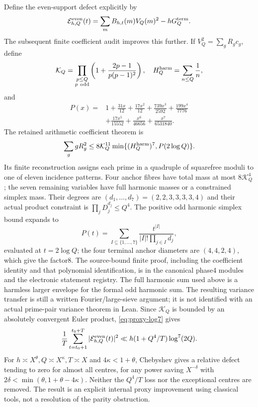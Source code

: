 \documentclass[11pt,a4paper]{article}
\theoremstyle{definition}
\theoremstyle{remark}
\begin{document}
Define the even-support defect explicitly by
\[\mathcal E^{\rm even}_{h,Q}(t)
 =\sum_m B_{h,t}(m)V_Q(m)^2-hG_Q^{\rm term}.\]
The subsequent finite coefficient audit improves this further. If $V_Q^2=\sum_gR_gc_g$, define
\[\mathcal K_Q=\prod_{\substack{p\le Q\\p\ {\rm odd}}}
 \left(1+\frac{2p-1}{p(p-1)^2}\right),\quad H_Q^{\rm harm}=\sum_{n\le Q}\frac1n,\]
and
\begin{align*}
 P(x)={}&1+\frac{31x}{12}+\frac{17x^2}{12}+\frac{739x^3}{2592}
 +\frac{199x^4}{7776}\\
 &+\frac{17x^5}{15552}+\frac{x^6}{46656}+\frac{x^7}{6531840}.
\end{align*}
The retained arithmetic coefficient theorem is
\begin{equation}\label{eq:proxy-log7}
 \sum_g gR_g^2\le8\mathcal K_Q^{11}
 \min\{(H_Q^{\rm harm})^7,P(2\log Q)\}.
\end{equation}
Its finite reconstruction assigns each prime in a quadruple of squarefree moduli to one of eleven incidence patterns. Four anchor fibres have total mass at most $8\mathcal K_Q^4$; the seven remaining variables have full harmonic masses or a constrained simplex mass. Their degrees are $(d_1,\ldots,d_7)=(2,2,3,3,3,3,4)$ and their actual product constraint is $\prod_jD_j^{d_j}\le Q^4$. The positive odd harmonic simplex bound expands to
\[P(t)=\sum_{I\subseteq\{1,\ldots,7\}}
 \frac{t^{|I|}}{|I|!\prod_{j\in I}d_j},\]
evaluated at $t=2\log Q$; the four terminal anchor diameters are $(4,4,2,4)$, which give the factor8. The source-bound finite proof, including the coefficient identity and that polynomial identification, is in the canonical phase4 modules and the electronic statement registry. The full harmonic sum used above is a harmless larger envelope for the formal odd harmonic sum. The resulting variance transfer is still a written Fourier/large-sieve argument; it is not identified with an actual prime-pair variance theorem in Lean. Since $\mathcal K_Q$ is bounded by an absolutely convergent Euler product, \eqref{eq:proxy-log7} gives
\begin{equation}\label{eq:terminal-log7}
 \frac1T\sum_{t=t_0+1}^{t_0+T}|\mathcal E^{\rm even}_{h,Q}(t)|^2
 \ll h(1+Q^4/T)\log^7(2Q).
\end{equation}
For $h\asymp X^\theta,Q\asymp X^\kappa,T\asymp X$ and $4\kappa<1+\theta$, Chebyshev gives a relative defect tending to zero for almost all centres, for any power saving $X^{-\delta}$ with
$2\delta<\min(\theta,1+\theta-4\kappa)$. Neither the $Q^4/T$ loss nor the exceptional centres are removed. The result is an explicit internal proxy improvement using classical tools, not a resolution of the parity obstruction.
\end{document}
